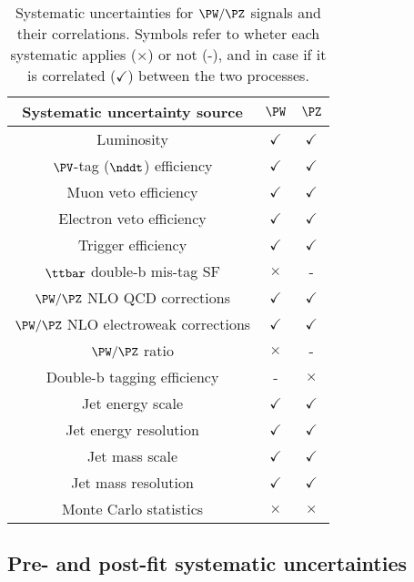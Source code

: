 \begin{table}[!ht]
\begin{center}
\caption{Systematic uncertainties for $\PW/\PZ$ signals and their correlations. Symbols refer to wheter each systematic applies ($\times$) or not (-), and in case if it is correlated ($\checkmark$) between the two processes. }
\label{tab:systematics2}
\begin{tabular}{ccc}
\hline\hline
Systematic uncertainty source &  $\PW$  & $\PZ$ \\
\hline
Luminosity         & $\checkmark$ &  $\checkmark$ \\
$\PV$-tag ($\nddt$) efficiency &  $\checkmark$ &  $\checkmark$\\
Muon veto efficiency   &  $\checkmark$ &  $\checkmark$ \\
Electron veto efficiency   &  $\checkmark$ &  $\checkmark$ \\
Trigger efficiency &   $\checkmark$ &  $\checkmark$\\
$\ttbar$ double-b mis-tag SF         & $\times$ &  - \\
$\PW/\PZ$ NLO QCD corrections & $\checkmark$ &  $\checkmark$\\
$\PW/\PZ$ NLO electroweak corrections & $\checkmark$ &  $\checkmark$\\
$\PW/\PZ$ ratio & $\times$ & -\\
Double-b tagging efficiency          & - & $\times$ \\
Jet energy scale              & $\checkmark$ &  $\checkmark$\\
Jet energy resolution              & $\checkmark$ &  $\checkmark$ \\
Jet mass scale              & $\checkmark$ &  $\checkmark$ \\
Jet mass resolution              & $\checkmark$ &  $\checkmark$\\
Monte Carlo statistics        & $\times$ &  $\times$ \\
\hline\hline
\end{tabular}
\end{center}
\end{table}


\clearpage

\subsection{Pre- and post-fit systematic uncertainties}


